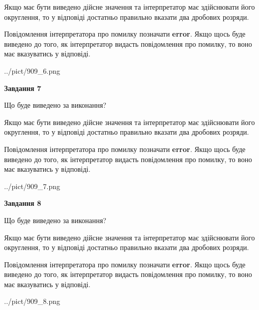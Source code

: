 \documentclass[12pt, ukrainian]{article}
\begin{document}
{\begin {Large}
Якщо має бути виведено дійсне значення та інтерпретатор має здійснювати його округлення, 
то у відповіді достатньо правильно вказати два дробових розряди.

Повідомлення інтерпретатора про помилку позначати \textbf{error}.
Якщо щось буде виведено до того, як інтерпретатор видасть повідомлення про помилку, 
то воно має вказуватись у відповіді. \par

\begin{center}
	{../pict/909_6.png}
\end{center}
\newpage

{\begin {center}\textbf{Завдання 7}\end {center}}\par
Що буде виведено за виконання? \par

Якщо має бути виведено дійсне значення та інтерпретатор має здійснювати його округлення, 
то у відповіді достатньо правильно вказати два дробових розряди.

Повідомлення інтерпретатора про помилку позначати \textbf{error}.
Якщо щось буде виведено до того, як інтерпретатор видасть повідомлення про помилку, 
то воно має вказуватись у відповіді. \par

\begin{center}
	{../pict/909_7.png}
\end{center}
\newpage

{\begin {center}\textbf{Завдання 8}\end {center}}\par
Що буде виведено за виконання? \par

Якщо має бути виведено дійсне значення та інтерпретатор має здійснювати його округлення, 
то у відповіді достатньо правильно вказати два дробових розряди.

Повідомлення інтерпретатора про помилку позначати \textbf{error}.
Якщо щось буде виведено до того, як інтерпретатор видасть повідомлення про помилку, 
то воно має вказуватись у відповіді. \par

\begin{center}
	{../pict/909_8.png}
\end{center}
\newpage


\end{Large}}
\end{document}

